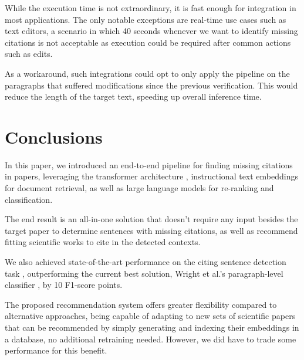 \documentclass[12pt,a4paper]{report}
\begin{document}
While the execution time is not extraordinary, it is fast enough for integration in most applications. The only notable exceptions are real-time use cases such as text editors, a scenario in which 40 seconds whenever we want to identify missing citations is not acceptable as execution could be required after common actions such as edits.

As a workaround, such integrations could opt to only apply the pipeline on the paragraphs that suffered modifications since the previous verification. This would reduce the length of the target text, speeding up overall inference time.

\chapter{Conclusions}


In this paper, we introduced an end-to-end pipeline for finding missing citations in papers, leveraging the transformer architecture \cite{vaswani2023attentionneed}, instructional text embeddings for document retrieval, as well as large language models for re-ranking and classification.

The end result is an all-in-one solution that doesn't require any input besides the target paper to determine sentences with missing citations, as well as recommend fitting scientific works to cite in the detected contexts.

We also achieved state-of-the-art performance on the citing sentence detection task \cite{Sugiyama2010IdentifyingCS}, outperforming the current best solution, Wright et al.'s paragraph-level classifier \cite{Wright2021CiteWorthCD}, by 10 F1-score points.

The proposed recommendation system offers greater flexibility compared to alternative approaches, being capable of adapting to new sets of scientific papers that can be recommended by simply generating and indexing their embeddings in a database, no additional retraining needed. However, we did have to trade some performance for this benefit.
\end{document}
